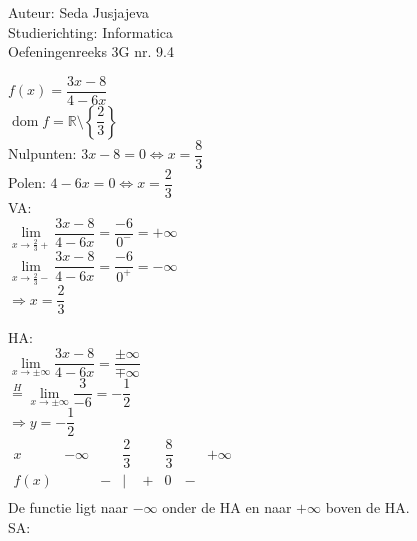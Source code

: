 \documentclass[a4paper]{article}
\newcommand{\limit}{\lim\limits}
\begin{document}
\noindent \large Auteur: Seda Jusjajeva\\
\noindent \large Studierichting: Informatica\\
\noindent \large Oefeningenreeks 3G nr. 9.4 \\

\medskip

\normalsize


$f(x) = \dfrac{3x - 8}{4 - 6x}$ \\

$\operatorname{dom}f = \mathbb{R} \setminus \left\{\dfrac{2}{3}\right\}$ \\

Nulpunten: $3x - 8 = 0 \Leftrightarrow x = \dfrac{8}{3}$ \\

Polen: $4 - 6x = 0 \Leftrightarrow x = \dfrac{2}{3}$ \\

VA: \\

$\limit_{x\to\tfrac{2}{3}+} \dfrac{3x - 8}{4 - 6x} = \dfrac{-6}{0^-} = +\infty$ \\

$\limit_{x\to\tfrac{2}{3}-} \dfrac{3x - 8}{4 - 6x} = \dfrac{-6}{0^+} = -\infty$ \\

$\Rightarrow x = \dfrac{2}{3}$

HA: \\

$\limit_{x\to\pm\infty} \dfrac{3x - 8}{4 - 6x} = \dfrac{\pm\infty}{\mp\infty}$ \\

$\overset{H}{=} \limit_{x\to\pm\infty} \dfrac{3}{-6} = -\dfrac{1}{2}$ \\

$\Rightarrow y = -\dfrac{1}{2}$ \\

$\begin{array}{c|ccccccc}
    x    & -\infty &   & \dfrac{2}{3} &   &\dfrac{8}{3}&   & +\infty \\ 
    \hline
    f(x) &         & - & |            & + & 0          & - &\\ 
\end{array}$ \\

De functie ligt naar $-\infty$ onder de HA en naar $+\infty$ boven de HA. \\

SA: \\
\end{document}
